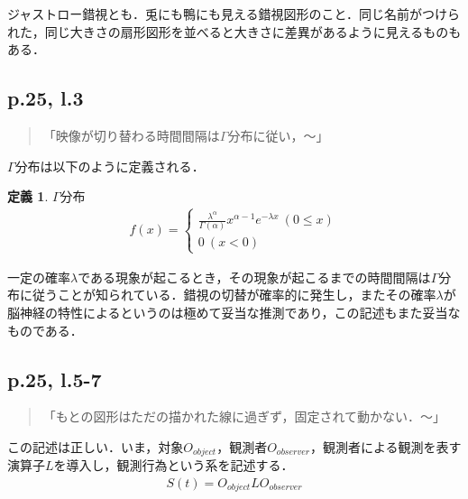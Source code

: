 \documentclass[10pt, a5paper, twoside]{jsarticle}
\theoremstyle{definition}
\newtheorem{dfn}{定義}
\begin{document}
                ジャストロー錯視とも．兎にも鴨にも見える錯視図形のこと．同じ名前がつけられた，同じ大きさの扇形図形を並べると大きさに差異があるように見えるものもある．

            \subsection{p.25, l.3}

                \begin{quote}

                    「映像が切り替わる時間間隔は$\Gamma$分布に従い，〜」

                \end{quote}

                $\Gamma$分布は以下のように定義される\cite{tki}．

                \begin{dfn}

                    $\Gamma$分布
                    \begin{align*}
                        f(x) = \begin{cases} \displaystyle \frac{\lambda^\alpha}{\Gamma (\alpha)} x^{\alpha - 1} e^{- \lambda x} \ (0 \leq x) \\ 0 \ (x < 0) \end{cases}
                    \end{align*}

                \end{dfn}

                一定の確率$\lambda$である現象が起こるとき，その現象が起こるまでの時間間隔は$\Gamma$分布に従うことが知られている．錯視の切替が確率的に発生し，またその確率$\lambda$が脳神経の特性によるというのは極めて妥当な推測であり，この記述もまた妥当なものである．

            \subsection{p.25, l.5-7}

                \begin{quote}

                    「もとの図形はただの描かれた線に過ぎず，固定されて動かない．〜」

                \end{quote}

                この記述は正しい．いま，対象$ O_{object}$，観測者$ O_{observer}$，観測者による観測を表す演算子$ L$を導入し，観測行為という系を記述する．
                \begin{align*}
                    S(t) = O_{object} L O_{observer}
                \end{align*}
\end{document}
